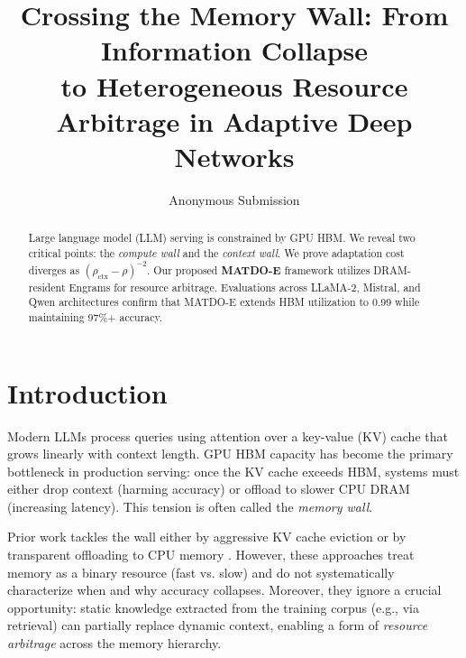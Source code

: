 \documentclass[11pt,a4paper]{article}
\title{Crossing the Memory Wall: From Information Collapse\\ to Heterogeneous Resource Arbitrage in Adaptive Deep Networks}
\author{Anonymous Submission}
\date{}
\theoremstyle{plain}
\theoremstyle{definition}
\begin{document}
\maketitle

\begin{abstract}
Large language model (LLM) serving is constrained by GPU HBM. We reveal two critical points: the \textit{compute wall} and the \textit{context wall}. We prove adaptation cost diverges as $(\rho_{\text{ctx}}-\rho)^{-2}$. Our proposed \textbf{MATDO-E} framework utilizes DRAM-resident Engrams for resource arbitrage. Evaluations across LLaMA-2, Mistral, and Qwen architectures confirm that MATDO-E extends HBM utilization to 0.99 while maintaining 97\%+ accuracy.
\end{abstract}

\section{Introduction}
Modern LLMs process queries using attention over a key-value (KV) cache that grows linearly with context length. GPU HBM capacity has become the primary bottleneck in production serving: once the KV cache exceeds HBM, systems must either drop context (harming accuracy) or offload to slower CPU DRAM (increasing latency). This tension is often called the \textit{memory wall}.

Prior work tackles the wall either by aggressive KV cache eviction \cite{snapkv,h2o,streamingllm} or by transparent offloading to CPU memory \cite{flexgen}. However, these approaches treat memory as a binary resource (fast vs. slow) and do not systematically characterize when and why accuracy collapses. Moreover, they ignore a crucial opportunity: static knowledge extracted from the training corpus (e.g., via retrieval) can partially replace dynamic context, enabling a form of \textit{resource arbitrage} across the memory hierarchy.
\end{document}
